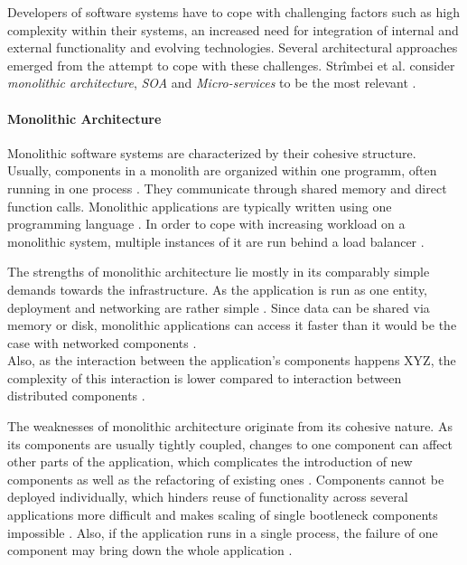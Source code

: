Developers of software systems have to cope with challenging factors such as high complexity within their systems, an increased need for integration of internal and external functionality and evolving technologies. Several architectural approaches emerged from the attempt to cope with these challenges. Strîmbei et al. consider \emph{monolithic architecture}, \emph{\ac{SOA}} and \emph{Micro-services} to be the most relevant \cite[p.~13]{Strimbei2015Software}.

\paragraph{Monolithic Architecture} %
\label{par:monolithic_architecture}
Monolithic software systems are characterized by their cohesive structure. Usually, components in a monolith are organized within one programm, often running in one process \cite[p.~35]{Stubbs2015Distributed}. They communicate through shared memory and direct function calls. Monolithic applications are typically written using one programming language \cite[p.~14]{Strimbei2015Software}. In order to cope with increasing workload on a monolithic system, multiple instances of it are run behind a load balancer \cite[p.~35]{Stubbs2015Distributed}.

The strengths of monolithic architecture lie mostly in its comparably simple demands towards the infrastructure. As the application is run as one entity, deployment and networking are rather simple \cite[p.~35]{Stubbs2015Distributed}. Since data can be shared via memory or disk, monolithic applications can access it faster than it would be the case with networked components \cite[p.~14]{Strimbei2015Software}. \\
Also, as the interaction between the application's components happens XYZ, the complexity of this interaction is lower compared to interaction between distributed components \cite[p.~14]{Strimbei2015Software}.

The weaknesses of monolithic architecture originate from its cohesive nature. As its components are usually tightly coupled, changes to one component can affect other parts of the application, which complicates the introduction of new components as well as the refactoring of existing ones \cite{Stubbs2015Distributed}.
Components cannot be deployed individually, which hinders reuse of functionality across several applications more difficult and makes scaling of single bootleneck components impossible \cite{Stubbs2015Distributed}. Also, if the application runs in a single process, the failure of one component may bring down the whole application \cite[p.~5]{Newman2015Building}.

